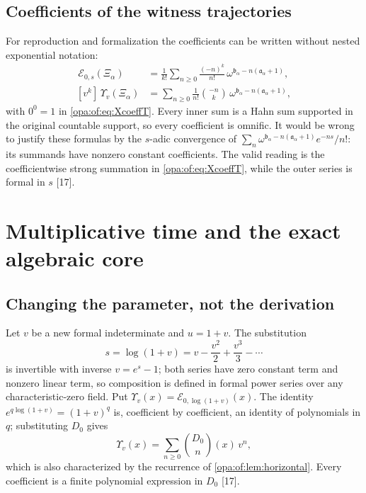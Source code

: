 \documentclass[11pt,oneside]{article}
\numberwithin{equation}{section}
\theoremstyle{definition}
\theoremstyle{remark}
\newcommand{\EE}{\mathcal E}
\newcommand{\src}[1]{\textup{\textsf{\small[#1]}}}
\begin{document}
\subsection{Coefficients of the witness trajectories}

For reproduction and formalization the coefficients can be written without nested exponential notation:
\begin{align}
 [s^k]\,\EE_{0,s}(\Xi_\alpha)&=\frac1{k!}\sum_{n\ge0}\frac{(-n)^k}{n!}\,\omega^{\mathfrak b_\alpha-n(\mathfrak a_\alpha+1)},\label{opa:of:eq:XcoeffT}\\
 [v^k]\,\Upsilon_v(\Xi_\alpha)&=\sum_{n\ge0}\frac1{n!}\binom{-n}k\,\omega^{\mathfrak b_\alpha-n(\mathfrak a_\alpha+1)},\label{opa:of:eq:XcoeffU}
\end{align}
with $0^0=1$ in \eqref{opa:of:eq:XcoeffT}. Every inner sum is a Hahn sum supported in the original countable support, so every
coefficient is omnific. It would be wrong to justify these formulas by the $s$-adic convergence of
$\sum_n\omega^{\mathfrak b_\alpha-n(\mathfrak a_\alpha+1)}e^{-ns}/n!$: its summands have nonzero constant coefficients. The valid reading is
the coefficientwise strong summation in \eqref{opa:of:eq:XcoeffT}, while the outer series is formal in $s$ \src{17}.

\section{Multiplicative time and the exact algebraic core}\label{opa:of:sec:multiplicative}

\subsection{Changing the parameter, not the derivation}

Let $v$ be a new formal indeterminate and $u=1+v$. The substitution
\begin{equation}\label{opa:of:eq:substitution}
 s=\log(1+v)=v-\frac{v^2}2+\frac{v^3}3-\cdots
\end{equation}
is invertible with inverse $v=e^s-1$; both series have zero constant term and nonzero linear term, so composition is defined in
formal power series over any characteristic-zero field. Put $\Upsilon_v(x)=\EE_{0,\log(1+v)}(x)$. The identity
$e^{q\log(1+v)}=(1+v)^q$ is, coefficient by coefficient, an identity of polynomials in $q$; substituting $D_0$ gives
\begin{equation}\label{opa:of:eq:binop}
 \Upsilon_v(x)=\sum_{n\ge0}\binom{D_0}n(x)\,v^n,
\end{equation}
which is also characterized by the recurrence of \cref{opa:of:lem:horizontal}. Every coefficient is a finite polynomial
expression in $D_0$ \src{17}.
\end{document}
